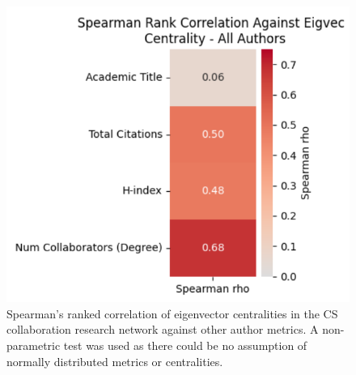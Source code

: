 \documentclass[9pt,twocolumn,twoside]{pnas-new}
\begin{document}
\begin{figure}[H]
    \centering
        \includegraphics[width=0.25\textheight]{CSCentrality.png}
    \caption{Spearman's ranked correlation of eigenvector centralities in the CS collaboration research network against other author metrics. A non-parametric test was used as there could be no assumption of normally distributed metrics or centralities.}
    \label{fig:CScentrality}
\end{figure}
\end{document}
